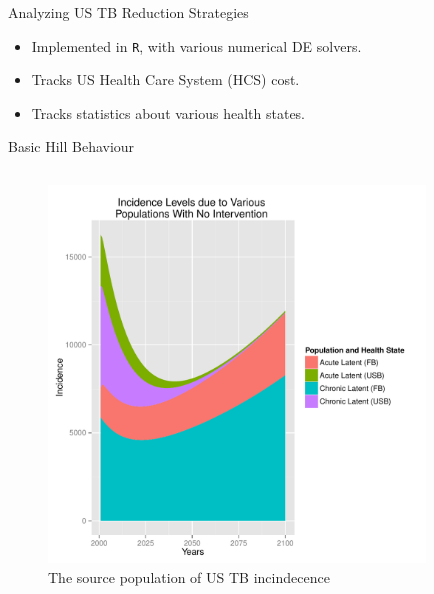 \documentclass[final]{beamer}
\begin{document}
\begin{frame}
\begin{columns}
    \begin{column}{.3\textwidth}
      \vspace{-1.5em}
      \begin{block}{Analyzing US TB Reduction Strategies}
        \begin{itemize}
          \item Implemented in \texttt{R}, with various numerical DE solvers.
          \item Tracks US Health Care System (HCS) cost.
          \item Tracks statistics about various health states.
        \end{itemize}
        \begin{block}{Basic Hill Behaviour}
          \vspace{-1.6em}
          \begin{column}{.45\textwidth}
            \begin{figure}[h]
              \begin{center}
                \includegraphics[height=10cm,width=\textwidth]{incPlotSourced}
              \end{center}
              \caption{The source population of US TB incindecence}
              \label{fig:incPlotSourced}
            \end{figure}
          \end{column}
          \begin{column}{.45\textwidth}
            \begin{figure}[h]
              \begin{center}

\end{center}
\end{figure}
\end{column}
\end{block}
\end{block}
\end{column}
\end{columns}
\end{frame}
\end{document}
